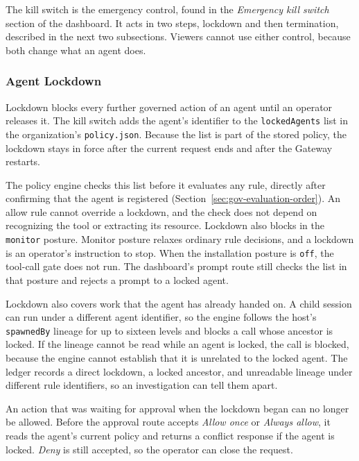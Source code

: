The kill switch is the emergency control, found in the \textit{Emergency
kill switch} section of the dashboard. It acts in two steps, lockdown and
then termination, described in the next two subsections. Viewers cannot
use either control, because both change what an agent does.

\subsubsection{Agent Lockdown}
\label{sec:gov-agent-lockdown}

Lockdown blocks every further governed action of an agent until an
operator releases it. The kill switch adds the agent's identifier to the
\texttt{lockedAgents} list in the organization's \texttt{policy.json}.
Because the list is part of the stored policy, the lockdown stays in force
after the current request ends and after the Gateway restarts.

The policy engine checks this list before it evaluates any rule, directly
after confirming that the agent is registered
(Section~\ref{sec:gov-evaluation-order}). An allow rule cannot override a
lockdown, and the check does not depend on recognizing the tool or
extracting its resource. Lockdown also blocks in the \texttt{monitor}
posture. Monitor posture relaxes ordinary rule decisions, and a lockdown is
an operator's instruction to stop. When the installation posture is
\texttt{off}, the tool-call gate does not run. The dashboard's prompt route
still checks the list in that posture and rejects a prompt to a locked
agent.

Lockdown also covers work that the agent has already handed on. A child
session can run under a different agent identifier, so the engine follows
the host's \texttt{spawnedBy} lineage for up to sixteen levels and blocks a
call whose ancestor is locked. If the lineage cannot be read while an agent
is locked, the call is blocked, because the engine cannot establish that it
is unrelated to the locked agent. The ledger records a direct lockdown, a
locked ancestor, and unreadable lineage under different rule identifiers,
so an investigation can tell them apart.

An action that was waiting for approval when the lockdown began can no
longer be allowed. Before the approval route accepts \textit{Allow once} or
\textit{Always allow}, it reads the agent's current policy and returns a
conflict response if the agent is locked. \textit{Deny} is still accepted,
so the operator can close the request.

